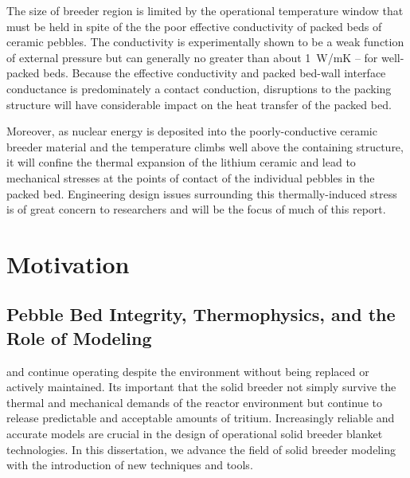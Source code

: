 The size of breeder region is limited by the operational temperature window that must be held in spite of the the poor effective conductivity of packed beds of ceramic pebbles. The conductivity is experimentally shown to be a weak function of external pressure but can generally no greater than about \si{1 W/{mK}} -- for well-packed beds. Because the effective conductivity and packed bed-wall interface conductance is predominately a contact conduction, disruptions to the packing structure will have considerable impact on the heat transfer of the packed bed.

Moreover, as nuclear energy is deposited into the poorly-conductive ceramic breeder material and the temperature climbs well above the containing structure, it will confine the thermal expansion of the lithium ceramic and lead to mechanical stresses at the points of contact of the individual pebbles in the packed bed. Engineering design issues surrounding this thermally-induced stress is of great concern to researchers and will be the focus of much of this report.































\section{Motivation}\label{sec:motivation}
\subsection{Pebble Bed Integrity, Thermophysics, and the Role of Modeling}\label{sec:intro-bed-integrity}
and continue operating despite the environment without being replaced or actively maintained. Its important that the solid breeder not simply survive the thermal and mechanical demands of the reactor environment but continue to release predictable and acceptable amounts of tritium. Increasingly reliable and accurate models are crucial in the design of operational solid breeder blanket technologies. In this dissertation, we advance the field of solid breeder modeling with the introduction of new techniques and tools.



